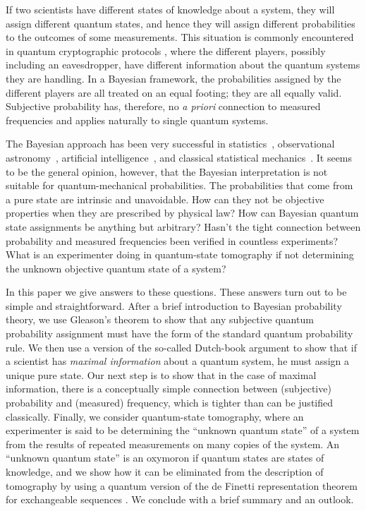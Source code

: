If two scientists have different states of knowledge about a system,
they will assign different quantum states, and hence they will
assign different probabilities to the outcomes of some measurements.
This situation is commonly encountered in quantum cryptographic
protocols \cite{Gisin01}, where the different players, possibly
including an eavesdropper, have different information about the
quantum systems they are handling. In a Bayesian framework, the
probabilities assigned by the different players are all treated on an
equal footing; they are all equally valid. Subjective probability has,
therefore, no {\it a priori\/} connection to measured frequencies and
applies naturally to single quantum systems.

The Bayesian approach has been very successful in
statistics~\cite{Savage72,BernardoSmith,Science}, observational
astronomy~\cite{Loredo}, artificial intelligence~\cite{Microsoft},
and classical statistical mechanics~\cite{Jaynes83}. It seems to be
the general opinion, however, that the Bayesian interpretation is not
suitable for quantum-mechanical probabilities.  The probabilities
that come from a pure state are intrinsic and unavoidable.  How can
they not be objective properties when they are prescribed by physical
law?  How can Bayesian quantum state assignments be anything but
arbitrary?  Hasn't the tight connection between probability and
measured frequencies been verified in countless experiments?  What is
an experimenter doing in quantum-state tomography
\cite{Leonhardt,Buzek98} if not determining the unknown objective
quantum state of a system?

In this paper we give answers to these questions. These answers turn
out to be simple and straightforward. After a brief introduction to
Bayesian probability theory, we use Gleason's theorem
\cite{Gleason57} to show that any subjective quantum probability
assignment must have the form of the standard quantum probability
rule.  We then use a version of the so-called Dutch-book argument
\cite{DeFinettiBook,Earman} to show that if a scientist has {\it
maximal information\/} about a quantum system, he must assign a
unique pure state.  Our next step is to show that in the
case of maximal information, there is a conceptually simple
connection between (subjective) probability and (measured) frequency,
which is tighter than can be justified classically.  Finally, we
consider quantum-state tomography, where an experimenter is said to
be determining the ``unknown quantum state'' of a system from the
results of repeated measurements on many copies of the system.  An
``unknown quantum state'' is an oxymoron if quantum states are states
of knowledge, and we show how it can be eliminated from the
description of tomography by using a quantum version of the de
Finetti representation theorem for exchangeable sequences
\cite{Hudson76,Caves01}.  We conclude with a brief summary and an
outlook.

